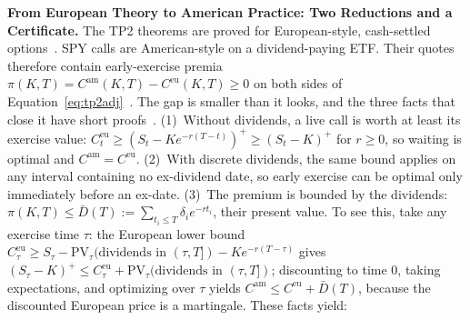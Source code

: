 \documentclass[sigconf,review]{acmart}
\begin{document}
\medskip\noindent\textbf{From European Theory to American Practice: Two Reductions and a Certificate.}
\label{sec:american}
The TP2 theorems are proved for European-style, cash-settled options~\cite{glasserman2026tp2theory}. SPY calls are American-style on a dividend-paying ETF. Their quotes therefore contain early-exercise premia $\pi(K,T)=C^{\mathrm{am}}(K,T)-C^{\mathrm{eu}}(K,T)\ge0$ on both sides of Equation~\eqref{eq:tp2adj}~\cite{cosma2020earlyexercise}. The gap is smaller than it looks, and the three facts that close it have short proofs~\cite{merton1973,black1975}. (1)~Without dividends, a live call is worth at least its exercise value: $C^{\mathrm{eu}}_t\ge(S_t-Ke^{-r(T-t)})^+\ge(S_t-K)^+$ for $r\ge0$, so waiting is optimal and $C^{\mathrm{am}}=C^{\mathrm{eu}}$. (2)~With discrete dividends, the same bound applies on any interval containing no ex-dividend date, so early exercise can be optimal only immediately before an ex-date. (3)~The premium is bounded by the dividends: $\pi(K,T)\le\bar D(T):=\sum_{t_i\le T}\delta_i e^{-rt_i}$, their present value. To see this, take any exercise time $\tau$: the European lower bound $C^{\mathrm{eu}}_\tau\ge S_\tau-\mathrm{PV}_\tau(\text{dividends in }(\tau,T])-Ke^{-r(T-\tau)}$ gives $(S_\tau-K)^+\le C^{\mathrm{eu}}_\tau+\mathrm{PV}_\tau(\text{dividends in }(\tau,T])$; discounting to time 0, taking expectations, and optimizing over $\tau$ yields $C^{\mathrm{am}}\le C^{\mathrm{eu}}+\bar D(T)$, because the discounted European price is a martingale. These facts yield:
\end{document}

